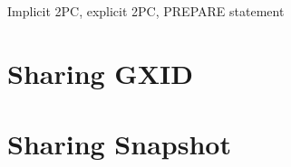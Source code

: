 
Implicit 2PC, explicit 2PC, PREPARE statement

\section{\label{sec:gxidTransfer}Sharing GXID}

\section{\label{sec:snapshot}Sharing Snapshot}

